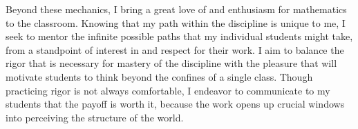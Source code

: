 \documentclass[12pt]{article}
\begin{document}
Beyond these mechanics, I bring a great love of and enthusiasm for mathematics to the classroom. Knowing that my path within the discipline is unique to me, 
I seek to mentor the infinite possible paths that my individual students might take, from a standpoint of interest in and respect for their work. 
I aim to balance the rigor that is necessary for mastery of the discipline with the pleasure that will motivate students to think beyond the confines of a single class. 
Though practicing rigor is not always comfortable, I endeavor to communicate to my students that the payoff is worth it, because the work opens up crucial windows into perceiving 
the structure of the world. 
\end{document}
